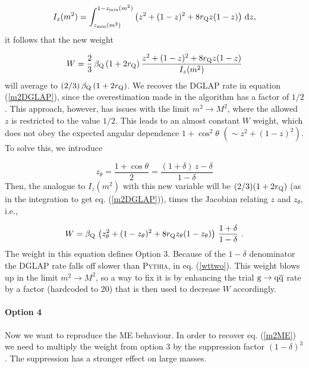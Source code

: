\documentclass[a4paper,12pt]{article}
\begin{document}
\begin{equation}
I_z(m^2) = \int_{z_{\mathrm{min}}(m^2)}^{1 - z_{\mathrm{min}}(m^2)} 
\left( z^2 + (1 - z)^2 + 8 r_{{\mathrm Q}} z (1 - z) \right) \, {\mathrm d} z,
\label{intz}
\end{equation}
it follows that the new weight

\begin{equation}
W = \frac{2}{3} \, \beta_{{\mathrm Q}} \, (1 + 2 r_{{\mathrm Q}}) \,
\frac{ z^2 + (1 - z)^2 + 8 r_{{\mathrm Q}} z (1 - z) }{I_z(m^2)}
\label{wtone}
\end{equation}
will average to $(2/3) \, \beta_{{\mathrm Q}} \, (1 + 2 r_{{\mathrm Q}})$. We recover the DGLAP rate in equation (\ref{m2DGLAP}), since the overestimation made in the algorithm has a factor of $1/2$.
This approach, however, has issues with the limit $m^2 \to M^2$, where the allowed $z$ is restricted to the value $1/2$. This leads to an almost constant $W$ weight, which does not obey the expected angular dependence $1+\cos^2\theta$ $(\sim z^2 + (1-z)^2)$. To solve this, we introduce

\begin{equation}
z_{\theta} = \frac{1 + \cos\theta}{2} = 
\frac{ (1 + \delta) \, z - \delta}{1 - \delta}
\end{equation}
Then, the analogue to $I_z(m^2)$ with this new variable will be $(2/3)(1+2r_{\mathrm Q})$ (as in the integration to get eq. (\ref{m2DGLAP})), times the Jacobian relating $z$ and $z_\theta$, i.e.,

\begin{equation}
W = \beta_{{\mathrm Q}} \, \left( z_{\theta}^2 + (1 - z_{\theta})^2 + 8 r_{{\mathrm Q}} z_{\theta} 
(1 - z_{\theta}) \right) \, \frac{1 + \delta}{1 - \delta} ~.
\label{wttwo}
\end{equation}
The weight in this equation defines Option 3.
Because of the $1-\delta$ denominator the DGLAP rate falls off slower than \textsc{Pythia}, in eq. (\ref{wttwo}). This weight blows up in the limit $m^2\to M^2$, so a way to fix it is by enhancing the trial ${\mathrm g}\to {\mathrm q}\overline{\mathrm q}$ rate by a factor (hardcoded to 20) that is then used to decrease $W$ accordingly.

\paragraph{Option 4}

Now we want to reproduce the ME behaviour. In order to recover eq. (\ref{m2ME}) we need to multiply the weight from option 3 by the suppression factor $(1-\delta)^3$. The suppression has a stronger effect on large masses.
\end{document}
